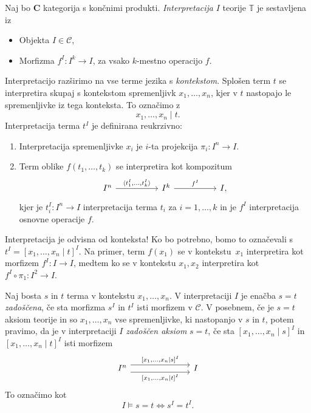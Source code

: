 \documentclass[../kategoricna_logika.tex]{subfiles}
\begin{document}
\begin{definicija}
  Naj bo $\mathbf{C}$ kategorija s končnimi
  produkti. \emph{Interpretacija} $I$ teorije $\mathbb{T}$ je
  sestavljena iz
  \begin{itemize}
  \item Objekta $I \in \mathcal{C}$,
  \item Morfizma $f^I : I^k \to I$, za vsako $k$-mestno operacijo $f$.
  \end{itemize}
%
  Interpretacijo razširimo na vse terme jezika s \emph{kontekstom}.
  Splošen term $t$ se interpretira skupaj s
  kontekstom spremenljivk $x_1, \ldots, x_n$, kjer v $t$ nastopajo le
  spremenljivke iz tega konteksta. To označimo z
$$x_1, \ldots, x_n \mid t.$$
%
Interpretacija terma $t^I$ je definirana reukrzivno:
  \begin{enumerate}
  \item Interpretacija spremenljivke $x_i$ je $i$-ta projekcija
    $\pi_i : I^n \to I.$
%
  \item Term oblike $f(t_1, \ldots, t_k)$ se interpretira kot
    kompozitum
    \begin{equation*}
      \begin{tikzcd}[column sep = 5em]
        I^n \ar[r, "{\langle t_1^I, \ldots, t_k^I\rangle}"] & I^k \ar[r, "f^I"] & I,
      \end{tikzcd}
    \end{equation*}
    kjer je $t_i^I : I^n \to I$ interpretacija terma $t_i$ za
    $i = 1, \ldots, k$ in je $f^I$ interpretacija osnovne operacije
    $f$.
  \end{enumerate}
\end{definicija}
%
\begin{opomba}
Interpretacija je odvisna od konteksta! Ko bo potrebno, bomo to označevali s
$t^I = [x_1, \ldots, x_n \mid t]^I$. Na primer, 
  term $f(x_1)$ se v kontekstu~$x_1$ interpretira kot morfizem
  $f^I : I \to I$, medtem ko se v kontekstu $x_1, x_2$ interpretira
  kot $f^I \circ \pi_1 : I^2 \to I$.
\end{opomba}
%
\begin{definicija}
  Naj bosta $s$ in $t$ terma v kontekstu $x_1, \ldots, x_n$.
 V interpretaciji $I$ je enačba $s = t$ \emph{zadoščena}, če
    sta morfizma $s^I$ in $t^I$ isti morfizem v $\mathcal{C}$.
%
V posebnem, če je $s = t$ aksiom teorije in so $x_1, \ldots, x_n$
  vse spremenljivke, ki nastopanjo v $s$ in $t$, potem pravimo, da je
  v interpretaciji $I$ \emph{zadoščen aksiom} $s = t$, če sta
  $[x_1, \ldots, x_n \mid s]^I$ in $[x_1, \ldots, x_n \mid t]^I$ isti
  morfizem
  \begin{equation*}
    \begin{tikzcd}[column sep = 7em]
      I^n \ar[r, shift left=1ex, "{[x_1, \ldots, x_n \mid s]^I}"]
      \ar[r, shift right=1ex, "{[x_1, \ldots, x_n \mid t]^I}"'] & I
    \end{tikzcd}
  \end{equation*}
%
  To označimo kot
$$I \models s = t \iff s^I = t^I.$$
\end{definicija}
\end{document}

